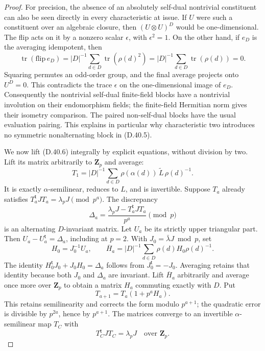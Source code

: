 \begin{proof}
For precision, the absence of an absolutely
self-dual nontrivial constituent can also be
seen directly in every characteristic at issue.
If \(U\) were such a constituent over an
algebraic closure, then
\((U\otimes U)^D\) would be one-dimensional.
The flip acts on it by a nonzero scalar
\(\epsilon\), with \(\epsilon^2=1\).
On the other hand, if \(e_D\) is the averaging
idempotent, then
\[
 \operatorname{tr}(\mathrm{flip}\,e_D)
    =|D|^{-1}\sum_{d\in D}\operatorname{tr}(\rho(d)^2)
    =|D|^{-1}\sum_{d\in D}\operatorname{tr}(\rho(d))
    =0.
 \tag{D.40.7}
\]
Squaring permutes an odd-order group, and
the final average projects onto \(U^D=0\).
This contradicts the trace \(\epsilon\) on
the one-dimensional image of \(e_D\).
Consequently the nontrivial self-dual finite-field
blocks have a nontrivial involution on their
endomorphism fields; the finite-field Hermitian
norm gives their isometry comparison.
The paired non-self-dual blocks have the usual
evaluation pairing.  This explains in particular
why characteristic two introduces no symmetric
nonalternating block in \textup{(D.40.5)}.

We now lift \textup{(D.40.6)} integrally by
explicit equations, without division by two.
Lift its matrix arbitrarily to \(\mathbf Z_p\)
and average:
\[
 T_1=|D|^{-1}\sum_{d\in D}
          \rho(\alpha(d))\,\widetilde L\,\rho(d)^{-1}.
 \tag{D.40.8}
\]
It is exactly \(\alpha\)-semilinear, reduces
to \(L\), and is invertible.
Suppose \(T_a\) already satisfies
\(T_a^{\mathsf t}JT_a=\lambda_pJ\pmod{p^a}\).
The discrepancy
\[
 \Delta_a=
   \frac{\lambda_pJ-T_a^{\mathsf t}JT_a}{p^a}\pmod p
 \tag{D.40.9}
\]
is an alternating \(D\)-invariant matrix.
Let \(U_a\) be its strictly upper triangular
part.  Then \(U_a-U_a^{\mathsf t}=\Delta_a\),
including at \(p=2\).
With \(J_0=\bar\lambda J\bmod p\), set
\[
 H_0=J_0^{-1}U_a,\qquad
 \overline H_a=|D|^{-1}\sum_{d\in D}
                  \rho(d)H_0\rho(d)^{-1}.
 \tag{D.40.10}
\]
The identity
\(H_0^{\mathsf t}J_0+J_0H_0=\Delta_a\)
follows from \(J_0^{\mathsf t}=-J_0\).
Averaging retains that identity because
both \(J_0\) and \(\Delta_a\) are invariant.
Lift \(\overline H_a\) arbitrarily and average
once more over \(\mathbf Z_p\) to obtain a
matrix \(H_a\) commuting exactly with \(D\).
Put
\[
                    T_{a+1}=T_a(1+p^aH_a).
 \tag{D.40.11}
\]
This retains semilinearity and corrects the
form modulo \(p^{a+1}\); the quadratic error
is divisible by \(p^{2a}\), hence by \(p^{a+1}\).
The matrices converge to an invertible
\(\alpha\)-semilinear map \(T_C\) with
\[
                       T_C^{\mathsf t}JT_C=\lambda_pJ
                         \quad\text{over }\mathbf Z_p.
 \tag{D.40.12}
\]


\end{proof}

